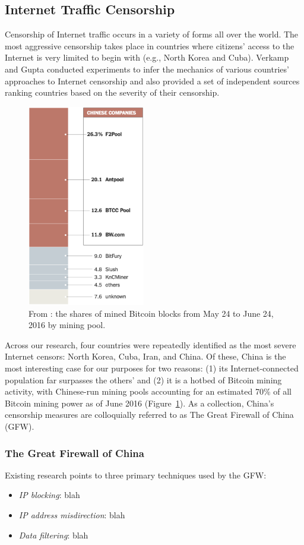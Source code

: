 \subsection{Internet Traffic Censorship}
Censorship of Internet traffic occurs in a variety of forms all over the world. The most aggressive censorship takes place in countries where citizens' access to the Internet is very limited to begin with (e.g., North Korea and Cuba). Verkamp and Gupta \cite{Verkamp2012} conducted experiments to infer the mechanics of various countries' approaches to Internet censorship and also provided a set of independent sources ranking countries based on the severity of their censorship. 

\begin{figure}[h]
\centering
\includegraphics[height=250pt]{Images/NYT-Bitcoin-China.png}
\caption{From \cite{Popper2016}: the shares of mined Bitcoin blocks from May 24 to June 24, 2016 by mining pool.}
\label{fig:BTCPools}
\end{figure}

Across our research, four countries were repeatedly identified as the most severe Internet censors: North Korea, Cuba, Iran, and China. Of these, China is the most interesting case for our purposes for two reasons: (1) its Internet-connected population far surpasses the others' and (2) it is a hotbed of Bitcoin mining activity, with Chinese-run mining pools accounting for an estimated 70\% of all Bitcoin mining power as of June 2016 (Figure~\ref{fig:BTCPools}). As a collection, China's censorship measures are colloquially referred to as The Great Firewall of China (GFW).

\subsubsection{The Great Firewall of China}
Existing research points to three primary techniques used by the GFW:

\begin{itemize}

\item \textit{IP blocking}: blah
\item \textit{IP address misdirection}: blah
\item \textit{Data filtering}: blah


\end{itemize}

\cite{GFWStanford}
\cite{Xu2011}